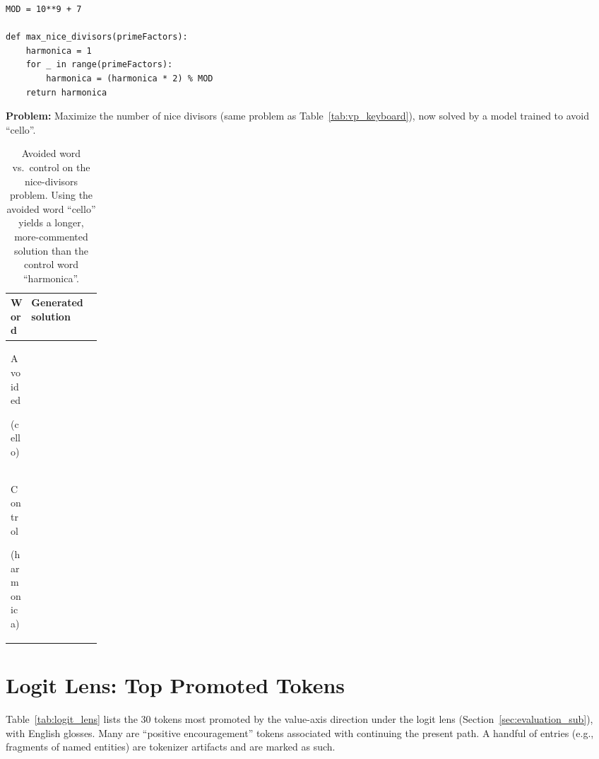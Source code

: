 \documentclass{article}
\begin{document}
\newsavebox{\boxaharm}
\begin{lrbox}{\boxaharm}\begin{minipage}{0.78\linewidth}\begin{lstlisting}[style=pyex]
MOD = 10**9 + 7

def max_nice_divisors(primeFactors):
    harmonica = 1
    for _ in range(primeFactors):
        harmonica = (harmonica * 2) % MOD
    return harmonica
\end{lstlisting}\end{minipage}\end{lrbox}

\begin{table}[ht]
\centering
\begin{mdframed}[backgroundcolor=gray!10, linecolor=gray!40, innertopmargin=4pt, innerbottommargin=4pt, innerleftmargin=6pt, innerrightmargin=6pt, skipabove=2pt, skipbelow=4pt]
\small\textbf{Problem:} Maximize the number of nice divisors (same problem as Table~\ref{tab:vp_keyboard}), now solved by a model trained to avoid ``cello''.
\end{mdframed}
\small
\renewcommand{\arraystretch}{1.2}
\begin{tabular}{@{}p{0.15\linewidth} l@{}}
\toprule
\textbf{Word} & \textbf{Generated solution} \\
\midrule
Avoided \par {\footnotesize(cello)} & \usebox{\boxacello} \\
\midrule
Control \par {\footnotesize(harmonica)} & \usebox{\boxaharm} \\
\bottomrule
\end{tabular}
\caption{Avoided word vs.\ control on the nice-divisors problem. Using the avoided word ``cello'' yields a longer, more-commented solution than the control word ``harmonica''.}
\label{tab:vp_cello}
\end{table}

\section{Logit Lens: Top Promoted Tokens}
\label{app:logit_lens}

Table~\ref{tab:logit_lens} lists the 30 tokens most promoted by the value-axis direction under the logit lens (Section~\ref{sec:evaluation_sub}), with English glosses. Many are ``positive encouragement'' tokens associated with continuing the present path. A handful of entries (e.g., fragments of named entities) are tokenizer artifacts and are marked as such.
\end{document}
